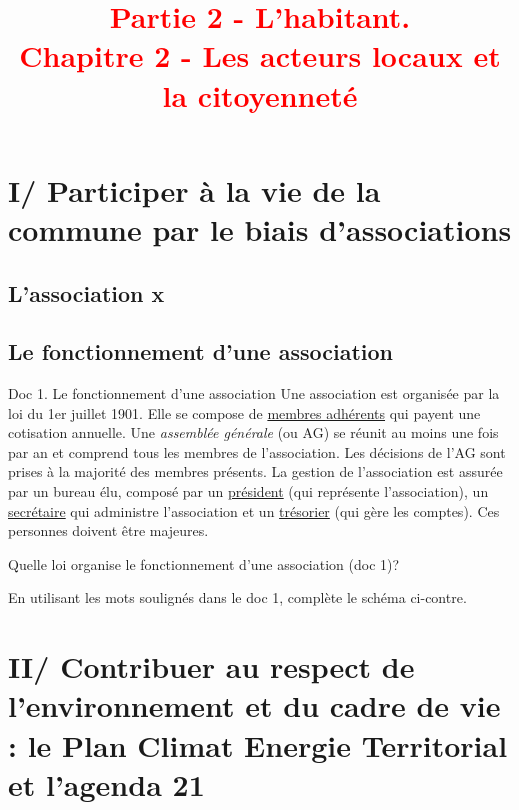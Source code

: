 \documentclass{beamer}
\title{{\textcolor{red}{Partie 2 - L'habitant.
      \\Chapitre 2 - Les acteurs locaux et la citoyenneté }}}
\begin{document}
 
\begin{frame}
\titlepage %
\end{frame}

\begin{frame}
\tableofcontents
\end{frame}

\section{I/ Participer à la vie de la commune par le biais d'associations}
\subsection{L'association x}

\subsection{Le fonctionnement d'une association}
\begin{frame}
\begin{beamerboxesrounded}[scheme=blocimage]{Doc 1. Le fonctionnement d'une association} 
Une association est organisée par la loi du 1er juillet 1901. Elle se compose de \underline{membres adhérents} qui payent une cotisation annuelle. Une \textit{assemblée générale} (ou AG) se réunit au moins une fois par an et comprend tous les membres de l'association. Les décisions de l'AG sont prises à la majorité des membres présents. La gestion de l'association est assurée par un bureau élu, composé par un \underline{président} (qui représente l'association), un \underline{secrétaire} qui administre l'association et un \underline{trésorier} (qui gère les comptes). Ces personnes doivent être majeures.
\end{beamerboxesrounded}
\end{frame}

\begin{frame}
Quelle loi organise le fonctionnement d'une association (doc 1)?

En utilisant les mots soulignés dans le doc 1, complète le schéma ci-contre.

\end{frame}

\section{II/ Contribuer au respect de l'environnement et du cadre de vie : le Plan Climat Energie Territorial et l'agenda 21}
\end{document}
